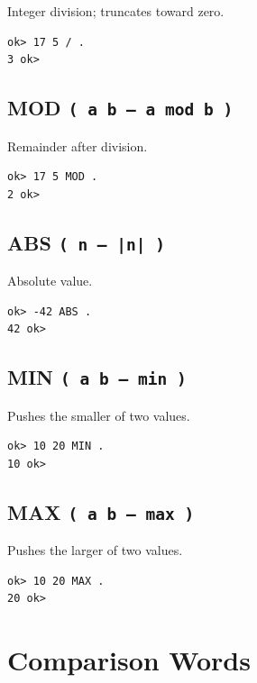 Integer division; truncates toward zero.

\begin{lstlisting}[language=Forth]
ok> 17 5 / .
3 ok>
\end{lstlisting}

\subsection*{MOD \texttt{( a b -- a mod b )}}

Remainder after division.

\begin{lstlisting}[language=Forth]
ok> 17 5 MOD .
2 ok>
\end{lstlisting}

\subsection*{ABS \texttt{( n -- |n| )}}

Absolute value.

\begin{lstlisting}[language=Forth]
ok> -42 ABS .
42 ok>
\end{lstlisting}

\subsection*{MIN \texttt{( a b -- min )}}

Pushes the smaller of two values.

\begin{lstlisting}[language=Forth]
ok> 10 20 MIN .
10 ok>
\end{lstlisting}

\subsection*{MAX \texttt{( a b -- max )}}

Pushes the larger of two values.

\begin{lstlisting}[language=Forth]
ok> 10 20 MAX .
20 ok>
\end{lstlisting}

\section{Comparison Words}
\label{sec:comparison}

